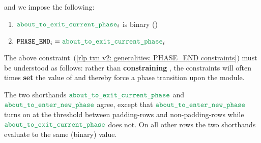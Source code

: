 and we impose the following:
\begin{enumerate}
    \item
        $\locAboutToExitPhase _{i}$ is binary \quad (\sanityCheck)
    \item \label{rlp txn v2: generalities: PHASE_END constraints}
        $\phaseEnd_{i} = \locAboutToExitPhase _{i}$
\end{enumerate}
\saNote{}
The above constraint~(\ref{rlp txn v2: generalities: PHASE_END constraints})
must be understood as follows: rather than \textbf{constraining} \phaseEnd{},
the constraints will often times \textbf{set} the value of \phaseEnd{} and thereby force a phase transition upon the module.

\saNote{}
The two shorthands $\locAboutToExitPhase$ and $\locAboutToEnterNewPhase$
agree, except that $\locAboutToEnterNewPhase$ turns on at the threshold between
padding-rows and non-padding-rows while $\locAboutToExitPhase$ does not.
On all other rows the two shorthands evaluate to the same (binary) value.
